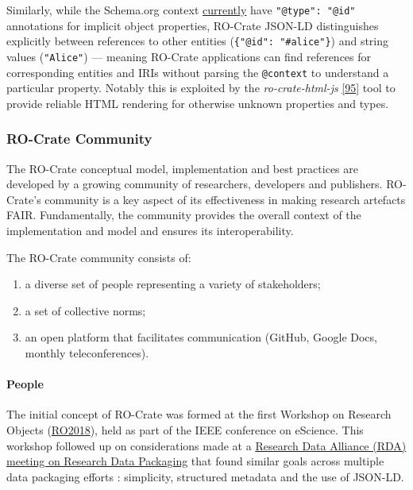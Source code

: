 {Similarly, while the Schema.org context
\href{https://schema.org/version/13.0/schemaorg-current-http.jsonld}{currently}
have \texttt{"@type":\ "@id"} annotations for implicit object
properties, RO-Crate JSON-LD distinguishes explicitly between references
to other entities (\texttt{\{"@id":\ "\#alice"\}}) and string values
(\texttt{"Alice"}) --- meaning RO-Crate applications can find references
for corresponding entities and IRIs without parsing the
\texttt{@context} to understand a particular property. Notably this is
exploited by the \emph{ro-crate-html-js}
\href{https://www.npmjs.com/package/ro-crate-html-js}{{[}95{]}} tool to
provide reliable HTML rendering for otherwise unknown properties and
types.

\hypertarget{community}{%
\subsubsection{RO-Crate Community}\label{community}}

The RO-Crate conceptual model, implementation and best practices are
developed by a growing community of researchers, developers and
publishers. RO-Crate's community is a key aspect of its effectiveness in
making research artefacts FAIR. Fundamentally, the community provides
the overall context of the implementation and model and ensures its
interoperability.

The RO-Crate community consists of:

\begin{enumerate}
\def\labelenumi{\arabic{enumi}.}
\tightlist
\item
  a diverse set of people representing a variety of stakeholders;
\item
  a set of collective norms;
\item
  an open platform that facilitates communication (GitHub, Google Docs,
  monthly teleconferences).
\end{enumerate}

\hypertarget{people}{%
\paragraph{People}\label{people}}

The initial concept of RO-Crate was formed at the first Workshop on
Research Objects
(\href{https://www.researchobject.org/ro2018/}{RO2018}), held as part of
the IEEE conference on eScience. This workshop followed up on
considerations made at a
\href{https://rd-alliance.org/approaches-research-data-packaging-rda-11th-plenary-bof-meeting}{Research
Data Alliance (RDA) meeting on Research Data Packaging} that found
similar goals across multiple data packaging efforts
\cite{Ó Carragáin 2019}: simplicity,
structured metadata and the use of JSON-LD.

}
